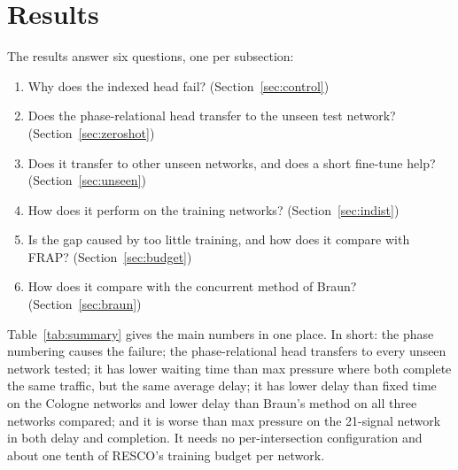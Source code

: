 \documentclass[conference]{IEEEtran}
\begin{document}
\section{Results}\label{sec:results}

The results answer six questions, one per subsection:
\begin{enumerate}
\item[A.] Why does the indexed head fail? (Section~\ref{sec:control})
\item[B.] Does the phase-relational head transfer to the unseen test network?
          (Section~\ref{sec:zeroshot})
\item[C.] Does it transfer to other unseen networks, and does a short fine-tune help?
          (Section~\ref{sec:unseen})
\item[D.] How does it perform on the training networks? (Section~\ref{sec:indist})
\item[E.] Is the gap caused by too little training, and how does it compare with FRAP?
          (Section~\ref{sec:budget})
\item[F.] How does it compare with the concurrent method of Braun? (Section~\ref{sec:braun})
\end{enumerate}
Table~\ref{tab:summary} gives the main numbers in one place. In short: the phase numbering
causes the failure; the phase-relational head transfers to every unseen network tested;
it has lower waiting time than max pressure where both complete the same traffic, but
the same average delay; it has lower delay than fixed time on the Cologne networks and
lower delay than Braun's method on all three networks compared; and it is worse than max
pressure on the 21-signal network in both delay and completion. It needs no
per-intersection configuration and about one tenth of RESCO's training budget per network.
\end{document}
